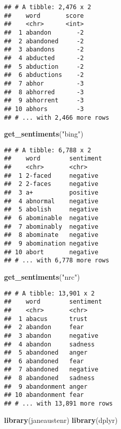 \documentclass[]{article}
\newenvironment{Shaded}{\begin{snugshade}}{\end{snugshade}}
\newcommand{\KeywordTok}[1]{\textcolor[rgb]{0.13,0.29,0.53}{\textbf{#1}}}
\newcommand{\StringTok}[1]{\textcolor[rgb]{0.31,0.60,0.02}{#1}}
\newcommand{\NormalTok}[1]{#1}
\begin{document}
\begin{verbatim}
## # A tibble: 2,476 x 2
##    word       score
##    <chr>      <int>
##  1 abandon       -2
##  2 abandoned     -2
##  3 abandons      -2
##  4 abducted      -2
##  5 abduction     -2
##  6 abductions    -2
##  7 abhor         -3
##  8 abhorred      -3
##  9 abhorrent     -3
## 10 abhors        -3
## # ... with 2,466 more rows
\end{verbatim}

\begin{Shaded}
\begin{Highlighting}[]
\KeywordTok{get_sentiments}\NormalTok{(}\StringTok{"bing"}\NormalTok{)}
\end{Highlighting}
\end{Shaded}

\begin{verbatim}
## # A tibble: 6,788 x 2
##    word        sentiment
##    <chr>       <chr>    
##  1 2-faced     negative 
##  2 2-faces     negative 
##  3 a+          positive 
##  4 abnormal    negative 
##  5 abolish     negative 
##  6 abominable  negative 
##  7 abominably  negative 
##  8 abominate   negative 
##  9 abomination negative 
## 10 abort       negative 
## # ... with 6,778 more rows
\end{verbatim}

\begin{Shaded}
\begin{Highlighting}[]
\KeywordTok{get_sentiments}\NormalTok{(}\StringTok{"nrc"}\NormalTok{)}
\end{Highlighting}
\end{Shaded}

\begin{verbatim}
## # A tibble: 13,901 x 2
##    word        sentiment
##    <chr>       <chr>    
##  1 abacus      trust    
##  2 abandon     fear     
##  3 abandon     negative 
##  4 abandon     sadness  
##  5 abandoned   anger    
##  6 abandoned   fear     
##  7 abandoned   negative 
##  8 abandoned   sadness  
##  9 abandonment anger    
## 10 abandonment fear     
## # ... with 13,891 more rows
\end{verbatim}

\begin{Shaded}
\begin{Highlighting}[]
\KeywordTok{library}\NormalTok{(janeaustenr)}
\KeywordTok{library}\NormalTok{(dplyr)}
\end{Highlighting}
\end{Shaded}
\end{document}
